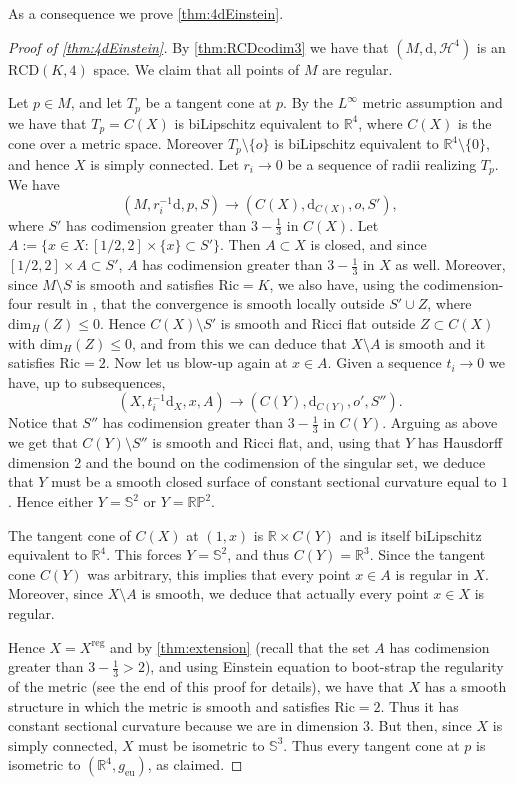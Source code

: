\documentclass[12pt,a4paper,reqno]{amsart}
\renewcommand{\leq}{\leqslant}
\begin{document}
As a consequence we  prove \cref{thm:4dEinstein}.
\begin{proof}[Proof of \cref{thm:4dEinstein}]
    By \cref{thm:RCDcodim3} we have that $(M,\mathrm{d},\mathcal{H}^4)$ is an $\mathrm{RCD}(K,4)$ space. We claim that all points of $M$ are regular.  
    
    Let $p\in M$, and let $T_p$ be a tangent cone at $p$. 
    By the $L^\infty$ metric assumption and \cite{DePhilippisGigli} we have that $T_p=C(X)$ is biLipschitz equivalent to $\mathbb R^4$, where $C(X)$ is the cone over a metric space. Moreover $T_p\setminus\{o\}$ is biLipschitz equivalent to $\mathbb R^4\setminus\{0\}$, and hence $X$ is simply connected. Let $r_i\to 0$ be a sequence of radii realizing $T_p$. We have
    \[
    (M,r_i^{-1}\mathrm{d},p,S)\to (C(X),\mathrm{d}_{C(X)},o,S'),
    \]
    where $S'$ has codimension greater than $3-\frac{1}{3}$ in $C(X)$. Let $A:=\{x\in X:[1/2,2]\times \{x\}\subset S'\}$. Then $A\subset X$ is closed, and since $[1/2,2]\times A\subset S'$, $A$ has codimension greater than $3-\frac{1}{3}$ in $X$ as well. Moreover, since $M\setminus S$ is smooth and satisfies $\mathrm{Ric}=K$, we also have, using the codimension-four result in \cite{CNAnnMath}, that the convergence is smooth locally outside $S'\cup Z$, where $\mathrm{dim}_H(Z)\leq 0$. Hence $C(X)\setminus S'$ is smooth and Ricci flat outside $Z\subset C(X)$ with $\mathrm{dim}_H(Z)\leq 0$, and from this we can deduce that $X\setminus A$ is smooth and it satisfies $\mathrm{Ric}=2$. Now let us blow-up again at $x\in A$. Given a sequence $t_i\to 0$ we have, up to subsequences,
    \[
    (X,t_i^{-1}\mathrm{d}_X,x,A)\to (C(Y),\mathrm{d}_{C(Y)},o',S'').
    \]
    Notice that $S''$ has codimension greater than $3-\frac{1}{3}$ in $C(Y)$. Arguing as above we get that $C(Y)\setminus S''$ is smooth and Ricci flat, and, using that $Y$ has Hausdorff dimension 2 and the bound on the codimension of the singular set, we deduce that $Y$ must be a smooth closed surface of constant sectional curvature equal to $1$. Hence either $Y=\mathbb S^2$ or $Y=\mathbb{RP}^2$. 

    The tangent cone of $C(X)$ at $(1,x)$ is $\mathbb R\times C(Y)$ and is itself biLipschitz equivalent to $\mathbb R^4$. This forces $Y=\mathbb S^2$, and thus $C(Y)=\mathbb R^3$. Since the tangent cone $C(Y)$ was arbitrary, this implies that every point $x\in A$ is regular in $X$. Moreover, since $X\setminus A$ is smooth, we deduce that actually every point $x\in X$ is regular.
    
    Hence $X=X^{\mathrm{reg}}$ and by \cref{thm:extension} (recall that the set $A$ has codimension greater than $3-\frac{1}{3}>2$), and using Einstein equation to boot-strap the regularity of the metric (see the end of this proof for details), we have that $X$ has a smooth structure in which the metric is smooth and satisfies $\mathrm{Ric}=2$. Thus it has constant sectional curvature because we are in dimension $3$. But then, since $X$ is simply connected, $X$ must be isometric to $\mathbb S^3$. Thus every tangent cone at $p$ is isometric to $(\mathbb R^4,g_{\mathrm{eu}})$, as claimed. 
    

\end{proof}
\end{document}
